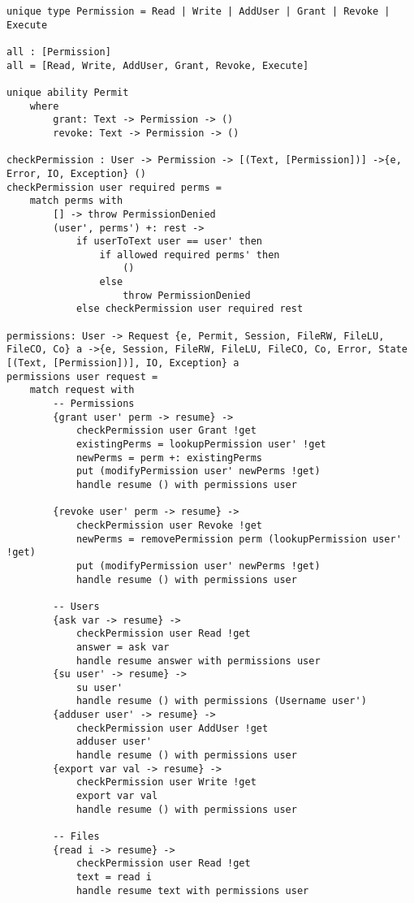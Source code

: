 \documentclass[logo,bsc,singlespacing,parskip]{infthesis}
\begin{document}
\begin{lstlisting}[language=unison]
unique type Permission = Read | Write | AddUser | Grant | Revoke | Execute

all : [Permission]
all = [Read, Write, AddUser, Grant, Revoke, Execute]

unique ability Permit 
    where 
        grant: Text -> Permission -> ()
        revoke: Text -> Permission -> ()

checkPermission : User -> Permission -> [(Text, [Permission])] ->{e, Error, IO, Exception} ()
checkPermission user required perms =
    match perms with
        [] -> throw PermissionDenied
        (user', perms') +: rest ->
            if userToText user == user' then
                if allowed required perms' then
                    ()
                else
                    throw PermissionDenied
            else checkPermission user required rest

permissions: User -> Request {e, Permit, Session, FileRW, FileLU, FileCO, Co} a ->{e, Session, FileRW, FileLU, FileCO, Co, Error, State [(Text, [Permission])], IO, Exception} a
permissions user request = 
    match request with
        -- Permissions 
        {grant user' perm -> resume} -> 
            checkPermission user Grant !get
            existingPerms = lookupPermission user' !get 
            newPerms = perm +: existingPerms
            put (modifyPermission user' newPerms !get)
            handle resume () with permissions user
        
        {revoke user' perm -> resume} ->
            checkPermission user Revoke !get
            newPerms = removePermission perm (lookupPermission user' !get)
            put (modifyPermission user' newPerms !get)
            handle resume () with permissions user

        -- Users
        {ask var -> resume} -> 
            checkPermission user Read !get
            answer = ask var
            handle resume answer with permissions user 
        {su user' -> resume} -> 
            su user'
            handle resume () with permissions (Username user')
        {adduser user' -> resume} -> 
            checkPermission user AddUser !get
            adduser user'
            handle resume () with permissions user
        {export var val -> resume} -> 
            checkPermission user Write !get
            export var val
            handle resume () with permissions user

        -- Files
        {read i -> resume} -> 
            checkPermission user Read !get
            text = read i
            handle resume text with permissions user


\end{lstlisting}
\end{document}
